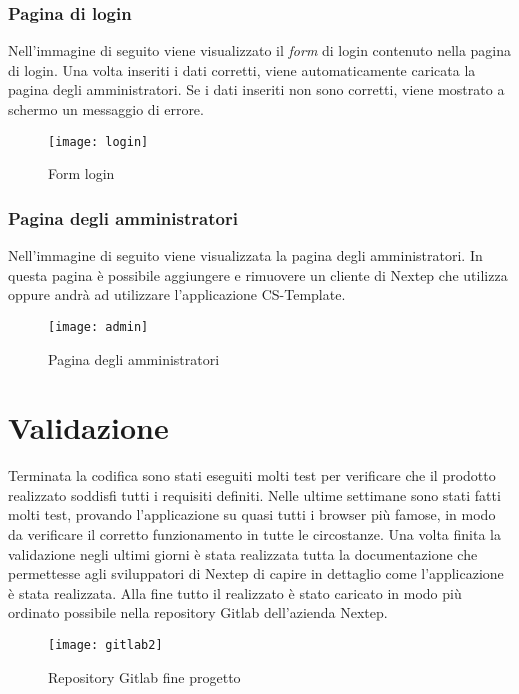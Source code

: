 \subsubsection{Pagina di login}
Nell'immagine di seguito viene visualizzato il \emph{form} di login contenuto nella pagina di login. Una volta inseriti i dati corretti, viene automaticamente caricata la pagina degli amministratori. Se i dati inseriti non sono corretti, viene mostrato a schermo un messaggio di errore.
\begin{figure}[!h] 
	\centering 
	\texttt{[image: login]} 
	\caption{Form login }
\end{figure}
\subsubsection{Pagina degli amministratori}
Nell'immagine di seguito viene visualizzata la pagina degli amministratori. In questa pagina è possibile aggiungere e rimuovere un cliente di Nextep che utilizza oppure andrà ad utilizzare l'applicazione CS-Template.
\begin{figure}[!h] 
	\centering 
	\texttt{[image: admin]} 
	\caption{Pagina degli amministratori }
\end{figure}

\section{Validazione} 
Terminata la codifica sono stati eseguiti molti test per verificare che il prodotto realizzato soddisfi tutti i requisiti definiti. Nelle ultime settimane sono stati fatti molti test, provando l'applicazione su quasi tutti i browser più famose, in modo da verificare il corretto funzionamento in tutte le circostanze. Una volta finita la validazione negli ultimi giorni è stata realizzata tutta la documentazione che permettesse agli sviluppatori di Nextep di capire in dettaglio come l'applicazione è stata realizzata. Alla fine tutto il realizzato è stato caricato in modo più ordinato possibile nella repository Gitlab dell'azienda Nextep.

\begin{figure}[!h] 
	\centering 
	\texttt{[image: gitlab2]} 
	\caption{Repository Gitlab fine progetto }
\end{figure} 